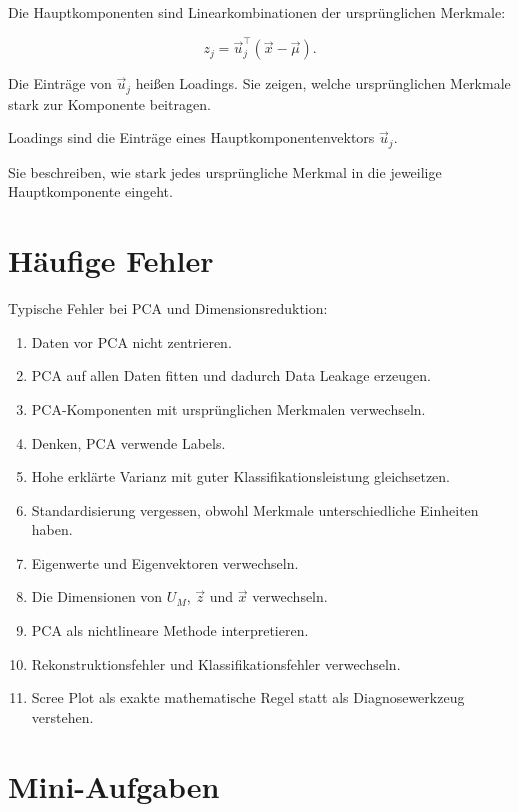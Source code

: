 Die Hauptkomponenten sind Linearkombinationen der ursprünglichen Merkmale:

\[
    z_j
    =
    \vec{u}_j^{\top}
    (\vec{x}-\vec{\mu}).
\]

Die Einträge von \(\vec{u}_j\) heißen Loadings.
Sie zeigen, welche ursprünglichen Merkmale stark zur Komponente beitragen.

\begin{definitionbox}
Loadings sind die Einträge eines Hauptkomponentenvektors \(\vec{u}_j\).

Sie beschreiben, wie stark jedes ursprüngliche Merkmal in die jeweilige Hauptkomponente eingeht.
\end{definitionbox}

\section{Häufige Fehler}

\begin{examtipbox}
Typische Fehler bei PCA und Dimensionsreduktion:

\begin{enumerate}
    \item Daten vor PCA nicht zentrieren.
    \item PCA auf allen Daten fitten und dadurch Data Leakage erzeugen.
    \item PCA-Komponenten mit ursprünglichen Merkmalen verwechseln.
    \item Denken, PCA verwende Labels.
    \item Hohe erklärte Varianz mit guter Klassifikationsleistung gleichsetzen.
    \item Standardisierung vergessen, obwohl Merkmale unterschiedliche Einheiten haben.
    \item Eigenwerte und Eigenvektoren verwechseln.
    \item Die Dimensionen von \(U_M\), \(\vec{z}\) und \(\vec{x}\) verwechseln.
    \item PCA als nichtlineare Methode interpretieren.
    \item Rekonstruktionsfehler und Klassifikationsfehler verwechseln.
    \item Scree Plot als exakte mathematische Regel statt als Diagnosewerkzeug verstehen.
\end{enumerate}
\end{examtipbox}

\section{Mini-Aufgaben}

